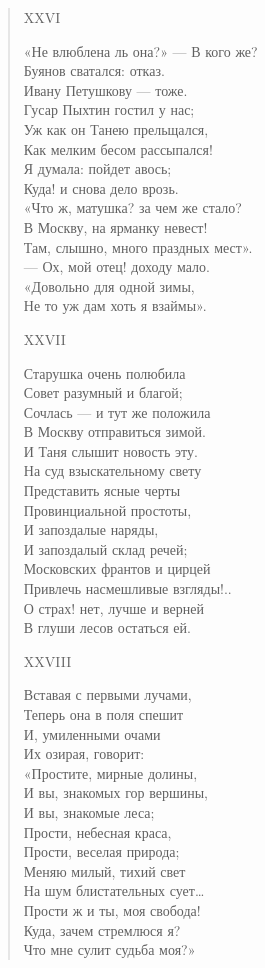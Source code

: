 \begin{verse}
XXVI

«Не влюблена ль она?» — В кого же?\\
Буянов сватался: отказ.\\
Ивану Петушкову — тоже.\\
Гусар Пыхтин гостил у нас;\\
Уж как он Танею прельщался,\\
Как мелким бесом рассыпался!\\
Я думала: пойдет авось;\\
Куда! и снова дело врозь.\\
«Что ж, матушка? за чем же стало?\\
В Москву, на ярманку невест!\\
Там, слышно, много праздных мест».\\
— Ох, мой отец! доходу мало.\\
«Довольно для одной зимы,\\
Не то уж дам хоть я взаймы».

XXVII

Старушка очень полюбила\\
Совет разумный и благой;\\
Сочлась — и тут же положила\\
В Москву отправиться зимой.\\
И Таня слышит новость эту.\\
На суд взыскательному свету\\
Представить ясные черты\\
Провинциальной простоты,\\
И запоздалые наряды,\\
И запоздалый склад речей;\\
Московских франтов и цирцей\\
Привлечь насмешливые взгляды!..\\
О страх! нет, лучше и верней\\
В глуши лесов остаться ей.

XXVIII

Вставая с первыми лучами,\\
Теперь она в поля спешит\\
И, умиленными очами\\
Их озирая, говорит:\\
«Простите, мирные долины,\\
И вы, знакомых гор вершины,\\
И вы, знакомые леса;\\
Прости, небесная краса,\\
Прости, веселая природа;\\
Меняю милый, тихий свет\\
На шум блистательных сует…\\
Прости ж и ты, моя свобода!\\
Куда, зачем стремлюся я?\\
Что мне сулит судьба моя?»


\end{verse}

